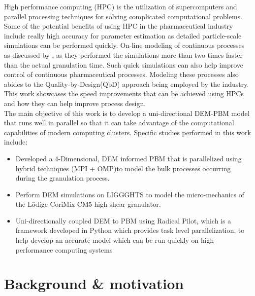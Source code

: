 \documentclass[preprint,11pt,authoryear]{elsarticle}
\begin{document}
High performance computing (HPC) is the utilization of supercomputers and parallel processing
techniques for solving complicated computational problems. Some of the potential benefits of using
HPC in the pharmaceutical industry include really high accuracy for parameter estimation as detailed 
particle-scale simulations can be performed quickly. On-line modeling of continuous processes as 
discussed by \citep{Bettencourt2017}, as they performed the simulations more than two times faster 
than the actual granulation time. Such quick simulations can also help improve control of 
continuous pharmaceutical processes. Modeling these processes also abides to the 
Quality-by-Design(QbD) approach being employed by the industry. This work showcases the speed 
improvements that can be achieved using HPCs and how they can help improve process design.\\
The main objective of this work is to develop a uni-directional DEM-PBM model that runs well in 
parallel so that it can take advantage of the computational capabilities of  modern computing 
clusters. Specific studies performed in this work include:
\begin{itemize}
\item Developed a 4-Dimensional, DEM informed PBM that is parallelized using hybrid techniques (MPI + 
OMP)to model the bulk processes occurring during the granulation process.
\item Perform DEM simulations on LIGGGHTS to  model the micro-mechanics of the L\"{o}dige CoriMix 
CM5 high shear granulator. 
\item Uni-directionally coupled DEM to PBM using Radical Pilot, which is a framework developed in
Python which provides task level parallelization, to help develop an accurate model which can be 
run quickly on high performance computing systems
\end{itemize}

\section{Background \& motivation}
\end{document}
